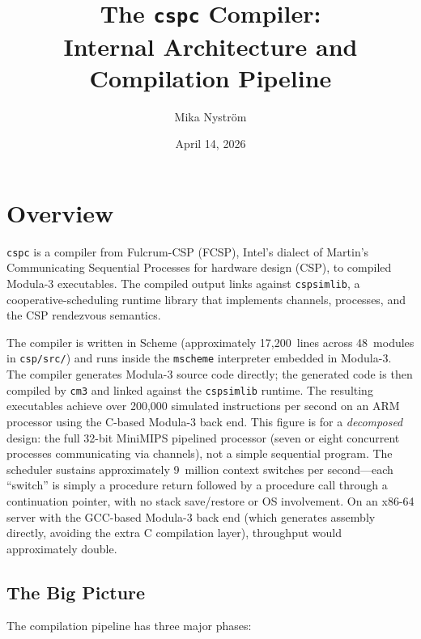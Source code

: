 \documentclass[11pt,letterpaper]{article}
\title{The \texttt{cspc} Compiler:\\
  Internal Architecture and Compilation Pipeline}
\author{Mika Nystr\"om}
\date{April 14, 2026}
\begin{document}
\maketitle
\tableofcontents
\newpage

\section{Overview}

\texttt{cspc} is a compiler from Fulcrum-CSP (FCSP), Intel's dialect of
Martin's Communicating Sequential Processes for hardware design (CSP), to compiled Modula-3
executables.  The compiled output links against \texttt{cspsimlib}, a
cooperative-scheduling runtime library that implements channels,
processes, and the CSP rendezvous semantics.

The compiler is written in Scheme (approximately 17,200~lines across
48~modules in \texttt{csp/src/}) and runs inside the \texttt{mscheme}
interpreter embedded in Modula-3.  The compiler generates Modula-3
source code directly; the generated code is then compiled by
\texttt{cm3} and linked against the \texttt{cspsimlib} runtime.
The resulting executables achieve over 200,000 simulated instructions
per second on an ARM processor using the C-based Modula-3 back end.
This figure is for a \emph{decomposed} design: the full 32-bit
MiniMIPS pipelined processor (seven or eight concurrent processes
communicating via channels), not a simple sequential program.  The
scheduler sustains approximately 9~million context switches per
second---each ``switch'' is simply a procedure return followed by a
procedure call through a continuation pointer, with no stack
save/restore or OS involvement.  On an x86-64 server with the
GCC-based Modula-3 back end (which generates assembly directly,
avoiding the extra C compilation layer), throughput would
approximately double.

\subsection{The Big Picture}

The compilation pipeline has three major phases:

\begin{center}
\end{center}
\end{document}
